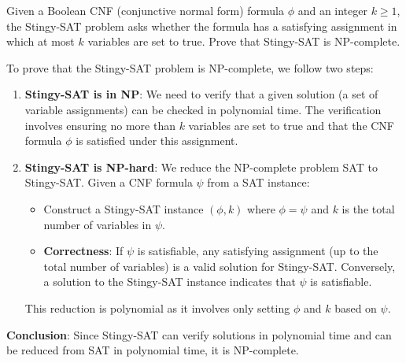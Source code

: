 \problem{}

Given a Boolean CNF (conjunctive normal form) formula $\phi$ and an integer $k \geq 1$, the Stingy-SAT problem asks whether the formula has a satisfying assignment in which at most $k$ variables are set to true. Prove that Stingy-SAT is NP-complete.

\solution{}


To prove that the Stingy-SAT problem is NP-complete, we follow two steps:

\begin{enumerate}
    \item \textbf{Stingy-SAT is in NP}: We need to verify that a given solution (a set of variable assignments) can be checked in polynomial time. The verification involves ensuring no more than \(k\) variables are set to true and that the CNF formula \(\phi\) is satisfied under this assignment.

    \item \textbf{Stingy-SAT is NP-hard}: We reduce the NP-complete problem SAT to Stingy-SAT. Given a CNF formula \(\psi\) from a SAT instance:
    \begin{itemize}
        \item Construct a Stingy-SAT instance \((\phi, k)\) where \(\phi = \psi\) and \(k\) is the total number of variables in \(\psi\).
        \item \textbf{Correctness}: If \(\psi\) is satisfiable, any satisfying assignment (up to the total number of variables) is a valid solution for Stingy-SAT. Conversely, a solution to the Stingy-SAT instance indicates that \(\psi\) is satisfiable.
    \end{itemize}
    This reduction is polynomial as it involves only setting \(\phi\) and \(k\) based on \(\psi\).
\end{enumerate}

\textbf{Conclusion}: Since Stingy-SAT can verify solutions in polynomial time and can be reduced from SAT in polynomial time, it is NP-complete.




\newpage